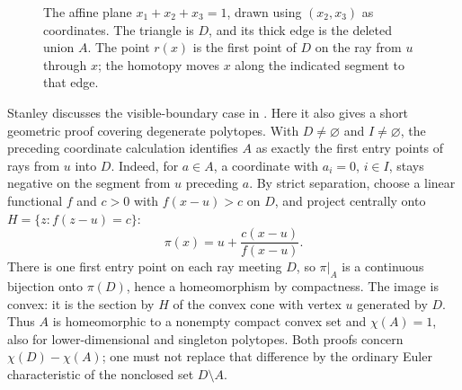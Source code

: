 \begin{figure}[htbp]
\centering
{}
\caption{The affine plane \(x_1+x_2+x_3=1\), drawn using
\((x_2,x_3)\) as coordinates. The triangle is \(D\), and its thick
edge is the deleted union \(A\). The point \(r(x)\) is the first
point of \(D\) on the ray from \(u\) through \(x\); the homotopy
moves \(x\) along the indicated segment to that edge.}
\label{fig:deleted-face}
\end{figure}

\begin{remark}\label{rem:visible-faces}
Stanley discusses the visible-boundary case in
\cite[discussion preceding and proof of Proposition~8.3]{Stanley1974Reciprocity}.
Here it also gives a short geometric proof covering degenerate polytopes.
With \(D\ne\varnothing\) and \(I\ne\varnothing\), the preceding
coordinate calculation identifies \(A\) as exactly the first entry
points of rays from \(u\) into \(D\). Indeed, for \(a\in A\),
a coordinate with \(a_i=0\), \(i\in I\), stays negative on the
segment from \(u\) preceding \(a\).
By strict separation, choose a linear functional \(f\) and \(c>0\) with
\(f(x-u)>c\) on \(D\), and project centrally onto
\(H=\{z:f(z-u)=c\}\):
\[
\pi(x)=u+\frac{c(x-u)}{f(x-u)}.
\]
There is one first entry point on each ray meeting \(D\), so
\(\pi|_A\) is a continuous bijection onto \(\pi(D)\), hence a
homeomorphism by compactness. The image is convex: it is the section
by \(H\) of the convex cone with vertex \(u\) generated by \(D\).
Thus \(A\) is homeomorphic to a nonempty compact convex set and
\(\chi(A)=1\), also for lower-dimensional and singleton polytopes.
Both proofs concern \(\chi(D)-\chi(A)\); one must not replace
that difference by the ordinary Euler characteristic of the nonclosed
set \(D\setminus A\).
\end{remark}

